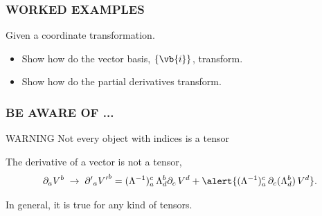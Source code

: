 {
\begin{frame}
  \frametitle{\alert{WORKED EXAMPLES}}
  Given a coordinate transformation.
  \begin{itemize}[<+-|alert@+>]
  \item  Show how do the vector basis, $\{\vb{i}\}$, transform.
  \item Show how do the partial derivatives transform. 
  \end{itemize}

\end{frame}
}

\begin{frame}
  \frametitle{BE AWARE OF ...}
  \begin{alertblock}{WARNING}
    Not every object with indices is a  tensor
  \end{alertblock}
  \begin{example}
    The derivative of a vector is not a tensor,
    \begin{align*}
      \partial_a V^b \;\to \;{\partial'}_a {V'}^b = (\Lambda^{-1})_a^c\, \Lambda^b_d\partial_c\, V^d + \alert{(\Lambda^{-1})_a^c\,\partial_c(\Lambda^b_d) \,V^d }.
    \end{align*}

    In general, it is true for any kind of tensors.
  \end{example}
\end{frame}


